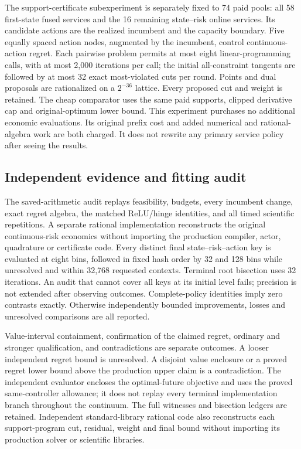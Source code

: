The support-certificate subexperiment is separately fixed to 74 paid pools:
all 58 first-state fused services and the 16 remaining state--risk online
services. Its candidate actions are the realized incumbent and the capacity
boundary. Five equally spaced action nodes, augmented by the incumbent,
control continuous-action regret. Each pairwise problem permits at most eight
linear-programming calls, with at most 2,000 iterations per call; the initial
all-constraint tangents are followed by at most 32 exact most-violated cuts
per round. Points and dual proposals are rationalized on a $2^{-36}$ lattice.
Every proposed cut and weight is retained. The cheap comparator uses the same
paid supports, clipped derivative cap and original-optimum lower bound.
This experiment purchases no additional economic evaluations. Its original
prefix cost and added numerical and rational-algebra work are both charged.
It does not rewrite any primary service policy after seeing the results.

\subsection{Independent evidence and fitting audit}

The saved-arithmetic audit replays feasibility, budgets, every incumbent
change, exact regret algebra, the matched ReLU/hinge identities, and all timed
scientific repetitions. A separate rational implementation reconstructs the
original continuous-risk economics without importing the production compiler,
actor, quadrature or certificate code. Every distinct final state--risk--action
key is evaluated at eight bins, followed in fixed hash order by 32 and 128 bins
while unresolved and within 32,768 requested contexts. Terminal root bisection
uses 32 iterations. An audit that cannot cover all keys at its initial level
fails; precision is not extended after observing outcomes. Complete-policy
identities imply zero contrasts exactly. Otherwise independently bounded
improvements, losses and unresolved comparisons are all reported.

Value-interval containment, confirmation of the claimed regret, ordinary and
stronger qualification, and contradictions are separate outcomes. A looser
independent regret bound is unresolved. A disjoint value enclosure or a proved
regret lower bound above the production upper claim is a contradiction. The
independent evaluator encloses the optimal-future objective and uses the proved
same-controller allowance; it does not replay every terminal implementation
branch throughout the continuum. The full witnesses and bisection ledgers are
retained. Independent standard-library rational code also reconstructs each
support-program cut, residual, weight and final bound without importing its
production solver or scientific libraries.

